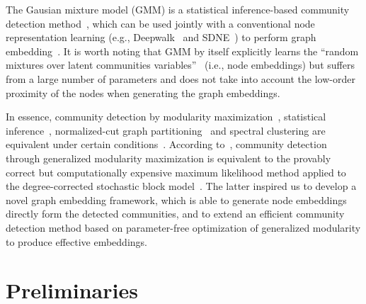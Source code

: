 \documentclass[conference]{IEEEtran}
\begin{document}
The Gausian mixture model (GMM) is a statistical inference-based community detection method~\cite{Zhan07}, which can be used jointly with a conventional node representation learning (e.g., Deepwalk~\cite{Dpwk14} and  SDNE~\cite{Sdne16}) to perform graph embedding~\cite{ComE17}. It is worth noting that GMM by itself explicitly learns the ``random mixtures over latent communities variables''~\cite{Zhan07} (i.e., node embeddings) but suffers from a large number of parameters and does not take into account the low-order proximity of the nodes
when generating the graph embeddings.


In essence, community detection by modularity maximization~\cite{Newm04}, statistical inference~\cite{Snij97}, normalized-cut graph partitioning~\cite{YuLb10}
and spectral clustering are equivalent under certain conditions~\cite{Newm13}. According to~\cite{Newm16}, community detection through generalized modularity maximization is equivalent to the provably correct but computationally expensive maximum likelihood method applied to the degree-corrected stochastic block model~\cite{Karr11,Peix14}. The latter inspired us to develop a novel graph embedding framework, which is able to generate node embeddings directly form the detected communities, and to extend an efficient community detection method based on parameter-free optimization of generalized modularity to produce effective embeddings.




\section{Preliminaries}  \label{sec:prelim}
\end{document}
